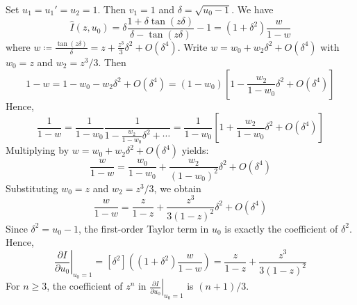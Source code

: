 Set $u_{1} = u_{1}' = u_{2} = 1$. Then $v_{1} = 1$ and $\delta = \sqrt{u_{0} - 1}$. We have
\begin{equation*}
    \hat{I}(z, u_{0}) = \delta \frac{1 + \delta\tan(z\delta)}{\delta - \tan(z\delta)} - 1 = (1 + \delta^{2})\frac{w}{1 - w}
\end{equation*}
where $w \coloneqq \frac{\tan(z\delta)}{\delta} = z + \frac{z^{3}}{3}\delta^{2} + O(\delta^{4})$.
Write $w = w_{0} + w_{2}\delta^{2} + O(\delta^{4})$ with $w_{0} = z$ and $w_{2} = z^{3}/3$. Then
\begin{equation*}
    1 - w = 1 - w_{0} - w_{2}\delta^{2} + O(\delta^{4}) = (1 - w_{0})\left[1 - \frac{w_{2}}{1 - w_{0}}\delta^{2} + O(\delta^{4})\right]
\end{equation*}
Hence,
\begin{equation*}
    \frac{1}{1 - w} = \frac{1}{1 - w_{0}} \frac{1}{1 - \frac{w_{2}}{1 - w_{0}}\delta^{2} + \cdots}
        = \frac{1}{1 - w_{0}}\left[1 + \frac{w_{2}}{1 - w_{0}}\delta^{2} + O(\delta^{4})\right]
\end{equation*}
Multiplying by $w = w_{0} + w_{2}\delta^{2} + O(\delta^{4})$ yields:
\begin{equation*}
    \frac{w}{1 - w} = \frac{w_{0}}{1 - w_{0}} + \frac{w_{2}}{(1 - w_{0})^{2}}\delta^{2} + O(\delta^{4})
\end{equation*}
Substituting $w_{0} = z$ and $w_{2} = z^{3}/3$, we obtain
\begin{equation} \label{eq:III.23.1}
    \frac{w}{1 - w} = \frac{z}{1 - z} + \frac{z^{3}}{3(1 - z)^{2}}\delta^{2} + O(\delta^{4})
\end{equation}
Since $\delta^{2} = u_{0} - 1$, the first-order Taylor term in $u_{0}$ is exactly the coefficient of $\delta^{2}$. Hence,
\begin{equation*}
    \left.\frac{\partial I}{\partial u_{0}}\right|_{u_{0} = 1}
        = [\delta^{2}] \left((1 + \delta^{2})\frac{w}{1 - w} \right)
        = \frac{z}{1 - z} + \frac{z^{3}}{3(1 - z)^{2}}
\end{equation*}
For $n \geq 3$, the coefficient of $z^{n}$ in
$\left.\frac{\partial I}{\partial u_{0}}\right|_{u_{0} = 1}$ is $(n + 1)/3$.

